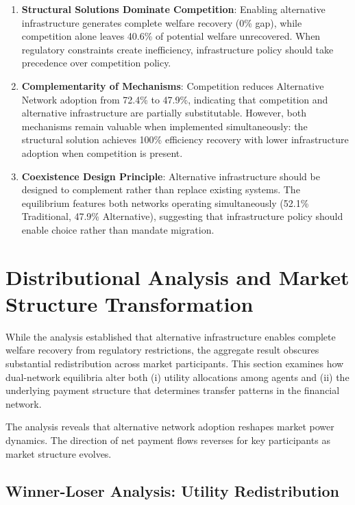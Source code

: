 \begin{enumerate}
    \item \textbf{Structural Solutions Dominate Competition}: Enabling alternative infrastructure generates complete welfare recovery (0\% gap), while competition alone leaves 40.6\% of potential welfare unrecovered. When regulatory constraints create inefficiency, infrastructure policy should take precedence over competition policy.
    
    \item \textbf{Complementarity of Mechanisms}: Competition reduces Alternative Network adoption from 72.4\% to 47.9\%, indicating that competition and alternative infrastructure are partially substitutable. However, both mechanisms remain valuable when implemented simultaneously: the structural solution achieves 100\% efficiency recovery with lower infrastructure adoption when competition is present.
    
    \item \textbf{Coexistence Design Principle}: Alternative infrastructure should be designed to complement rather than replace existing systems. The equilibrium features both networks operating simultaneously (52.1\% Traditional, 47.9\% Alternative), suggesting that infrastructure policy should enable choice rather than mandate migration.
\end{enumerate}

\section{Distributional Analysis and Market Structure Transformation}
\label{sec:distributional}

While the analysis established that alternative infrastructure enables complete welfare recovery from regulatory restrictions, the aggregate result obscures substantial redistribution across market participants. This section examines how dual-network equilibria alter both (i) utility allocations among agents and (ii) the underlying payment structure that determines transfer patterns in the financial network.

The analysis reveals that alternative network adoption reshapes market power dynamics. The direction of net payment flows reverses for key participants as market structure evolves.

\subsection{Winner-Loser Analysis: Utility Redistribution}

